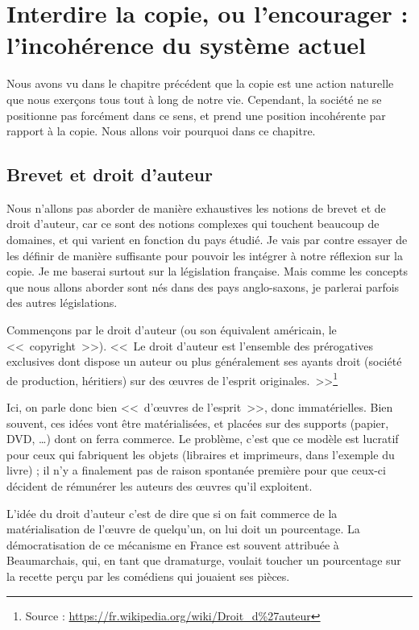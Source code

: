 \chapter{Interdire la copie, ou l'encourager : l'incohérence du système actuel}

Nous avons vu dans le chapitre précédent que la copie est une action naturelle que nous exerçons tous tout à long de notre vie.
Cependant, la société ne se positionne pas forcément dans ce sens, et prend une position incohérente par rapport à la copie.
Nous allons voir pourquoi dans ce chapitre.

\section{Brevet et droit d'auteur}

Nous n'allons pas aborder de manière exhaustives les notions de brevet et de droit d'auteur, car ce sont des notions complexes qui touchent beaucoup de domaines, et qui varient en fonction du pays étudié.
Je vais par contre essayer de les définir de manière suffisante pour pouvoir les intégrer à notre réflexion sur la copie.
Je me baserai surtout sur la législation française.
Mais comme les concepts que nous allons aborder sont nés dans des pays anglo-saxons, je parlerai parfois des autres législations.

Commençons par le droit d'auteur (ou son équivalent américain, le <<~copyright~>>).
<<~Le droit d'auteur est l'ensemble des prérogatives exclusives dont dispose un auteur ou plus généralement ses ayants droit (société de production, héritiers) sur des œuvres de l'esprit originales.~>>\footnote{Source : \url{https://fr.wikipedia.org/wiki/Droit_d\%27auteur}}

Ici, on parle donc bien <<~d'œuvres de l'esprit~>>, donc immatérielles.
Bien souvent, ces idées vont être matérialisées, et placées sur des supports (papier, DVD, \dots{}) dont on ferra commerce.
Le problème, c'est que ce modèle est lucratif pour ceux qui fabriquent les objets (libraires et imprimeurs, dans l'exemple du livre) ; il n'y a finalement pas de raison spontanée première pour que ceux-ci décident de rémunérer les auteurs des œuvres qu'il exploitent.

L'idée du droit d'auteur c'est de dire que si on fait commerce de la matérialisation de l'œuvre de quelqu'un, on lui doit un pourcentage.
La démocratisation de ce mécanisme en France est souvent attribuée à Beaumarchais, qui, en tant que dramaturge, voulait toucher un pourcentage sur la recette perçu par les comédiens qui jouaient ses pièces.


